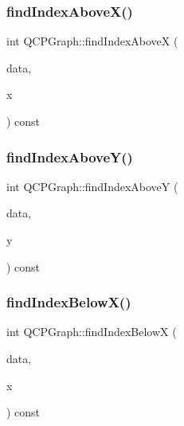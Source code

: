 \subsubsection{\texorpdfstring{findIndexAboveX()}{findIndexAboveX()}}
{\footnotesize\ttfamily int Q\+C\+P\+Graph\+::find\+Index\+AboveX (\begin{DoxyParamCaption}\item[{const Q\+Vector$<$ Q\+PointF $>$ $\ast$}]{data,  }\item[{double}]{x }\end{DoxyParamCaption}) const\hspace{0.3cm}{\ttfamily [protected]}}

\mbox{\label{class_q_c_p_graph_a8b952a5f937840dc242489585cc8000d}} 
\subsubsection{\texorpdfstring{findIndexAboveY()}{findIndexAboveY()}}
{\footnotesize\ttfamily int Q\+C\+P\+Graph\+::find\+Index\+AboveY (\begin{DoxyParamCaption}\item[{const Q\+Vector$<$ Q\+PointF $>$ $\ast$}]{data,  }\item[{double}]{y }\end{DoxyParamCaption}) const\hspace{0.3cm}{\ttfamily [protected]}}

\mbox{\label{class_q_c_p_graph_a8c3f15dd5a06633011a6ef36016d308b}} 
\subsubsection{\texorpdfstring{findIndexBelowX()}{findIndexBelowX()}}
{\footnotesize\ttfamily int Q\+C\+P\+Graph\+::find\+Index\+BelowX (\begin{DoxyParamCaption}\item[{const Q\+Vector$<$ Q\+PointF $>$ $\ast$}]{data,  }\item[{double}]{x }\end{DoxyParamCaption}) const\hspace{0.3cm}{\ttfamily [protected]}}

